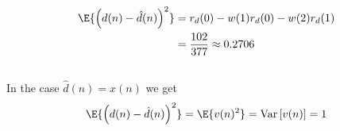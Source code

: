 \subsection{}
\begin{align}
	\E{\left(d(n)-\hat{d}(n)\right)^2}&=r_d(0)-w(1)r_d(0)-w(2)r_d(1)\\
	&=\frac{102}{377}\approx 0.2706	
\end{align}
\subsection{}
In the case $\hat{d}(n)=x(n)$ we get
\begin{align}
	\E{\left(d(n)-\hat{d}(n)\right)^2}=\E{v(n)^2}=\text{Var}\left[v(n)\right]=1\\
\end{align}





